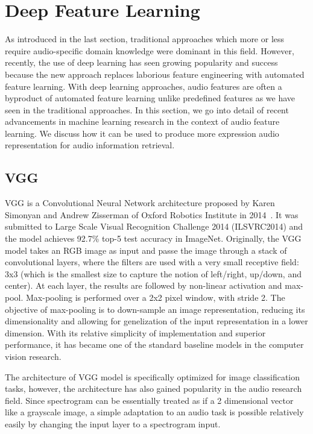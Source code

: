 \section{Deep Feature Learning}

As introduced in the last section, traditional approaches which more or less require audio-specific domain knowledge were dominant in this field. However, recently, the use of deep learning has seen growing popularity and success because the new approach replaces laborious feature engineering with automated feature learning.
With deep learning approaches, audio features are often a byproduct of automated feature learning unlike predefined features as we have seen in the traditional approaches.  In this section, we go into detail of recent advancements in machine learning research in the context of audio feature learning. We discuss how it can be used to produce more expression audio representation for audio information retrieval.


\subsection{VGG}
VGG is a Convolutional Neural Network architecture proposed by Karen Simonyan and Andrew Zisserman of Oxford Robotics Institute in 2014~\cite{simonyan2015}. It was submitted to Large Scale Visual Recognition Challenge 2014 (ILSVRC2014) and the model achieves 92.7\% top-5 test accuracy in ImageNet.
Originally, the VGG model takes an RGB image as input and passe the image through a stack of convolutional layers, where the filters are used with a very small receptive field: 3x3 (which is the smallest size to capture the notion of left/right, up/down, and center). At each layer, the results are followed by non-linear activation and max-pool. Max-pooling is performed over a 2x2 pixel window, with stride 2. The objective of max-pooling is to down-sample an image representation, reducing its dimensionality and allowing for genelization of the input representation in a lower dimension.
With its relative simplicity of implementation and superior performance, it has became one of the standard baseline models in the computer vision research.

The architecture of VGG model is specifically optimized for image classification tasks, however, the architecture has also gained popularity in the audio research field. Since spectrogram can be essentially treated as if a 2 dimensional vector like a grayscale image, a simple adaptation to an audio task is possible relatively easily by changing the input layer to a spectrogram input.

